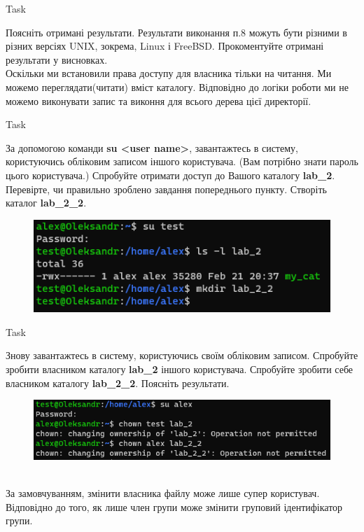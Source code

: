 \documentclass[a4paper,12pt]{article}
\newcommand{\RomanNumeralCaps}[1]{\MakeUppercase{\romannumeral #1}}
\begin{document}
    \begin{center}
        \Large{Task \RomanNumeralCaps{10}}
    \end{center}
    Поясніть отримані результати. Результати виконання п.8 можуть бути різними в різних версіях UNIX, зокрема, Linux і FreeBSD. Прокоментуйте отримані результати у
    висновках. \\
    Оскільки ми встановили права доступу для власника тільки на читання. Ми можемо переглядати(читати) вміст каталогу. 
    Відповідно до логіки роботи ми не можемо виконувати запис та виконня для всього дерева цієї директорії.
    
\newpage
    \begin{center}
        \Large{Task \RomanNumeralCaps{11}}
    \end{center}
    За допомогою команди \textbf{su <user name>}, завантажтесь в систему, користуючись обліковим записом іншого користувача. (Вам потрібно знати пароль цього
    користувача.) Спробуйте отримати доступ до Вашого каталогу \textbf{lab\_2}. Перевірте, чи правильно зроблено завдання попереднього пункту. Створіть каталог \textbf{lab\_2\_2}.
    \begin{figure}[h!]
        \begin{minipage}[h]{1\linewidth}
            \centering
            \includegraphics[width=0.6\linewidth]{Prt sc/Figure_11.png}  
        \end{minipage}
    \end{figure}

    \begin{center}
        \Large{Task \RomanNumeralCaps{12}}
    \end{center}
    Знову завантажтесь в систему, користуючись своїм обліковим записом. Спробуйте зробити власником каталогу \textbf{lab\_2} іншого користувача. Спробуйте зробити 
    себе власником каталогу \textbf{lab\_2\_2}. Поясніть результати.
    \begin{figure}[h!]
        \begin{minipage}[h]{1\linewidth}
            \centering
            \includegraphics[width=0.6\linewidth]{Prt sc/Figure_12.png}  
        \end{minipage}
    \end{figure} \\
    За замовчуванням, змінити власника файлу може лише супер користувач. Відповідно до того, як лише член групи може змінити груповий ідентифікатор групи. 
\end{document}
